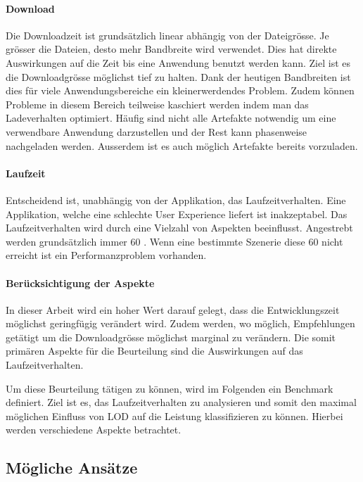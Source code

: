 \paragraph{Download}

Die Downloadzeit ist grundsätzlich linear abhängig von der Dateigrösse.
Je grösser die Dateien, desto mehr Bandbreite wird verwendet. Dies hat direkte Auswirkungen auf die Zeit bis eine Anwendung benutzt werden kann. Ziel ist es die Downloadgrösse möglichst tief zu halten.
Dank der heutigen Bandbreiten ist dies für viele Anwendungsbereiche ein kleinerwerdendes Problem.
Zudem können Probleme in diesem Bereich teilweise kaschiert werden indem man das Ladeverhalten optimiert. Häufig sind nicht alle Artefakte notwendig um eine verwendbare Anwendung darzustellen und der Rest kann phasenweise nachgeladen werden.
Ausserdem ist es auch möglich Artefakte bereits vorzuladen.

\paragraph{Laufzeit}

Entscheidend ist, unabhängig von der Applikation, das Laufzeitverhalten. Eine Applikation, welche eine schlechte User Experience liefert ist inakzeptabel.
Das Laufzeitverhalten wird durch eine Vielzahl von Aspekten beeinflusst.
Angestrebt werden grundsätzlich immer 60 . Wenn eine bestimmte Szenerie diese 60  nicht erreicht ist ein Performanzproblem vorhanden.

\paragraph{Berücksichtigung der Aspekte}
In dieser Arbeit wird ein hoher Wert darauf gelegt, dass die Entwicklungszeit möglichst geringfügig verändert wird. Zudem werden, wo möglich, Empfehlungen getätigt um die Downloadgrösse möglichst marginal zu verändern.
Die somit primären Aspekte für die Beurteilung sind die Auswirkungen auf das Laufzeitverhalten.

Um diese Beurteilung tätigen zu können, wird im Folgenden ein Benchmark definiert. Ziel ist es, das Laufzeitverhalten zu analysieren und somit den maximal möglichen Einfluss von LOD auf die Leistung klassifizieren zu können. Hierbei werden verschiedene Aspekte betrachtet.

\subsection{Mögliche Ansätze}

